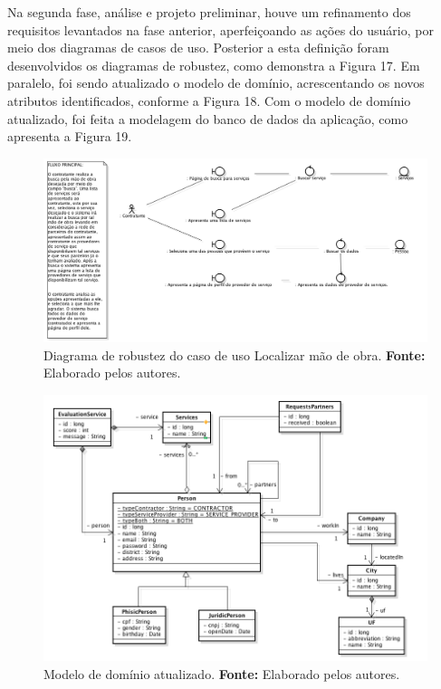 \par Na segunda fase, análise e projeto preliminar, houve um refinamento dos requisitos levantados na fase anterior, aperfeiçoando as ações do usuário, por meio dos diagramas de casos de uso. Posterior a esta definição foram desenvolvidos os diagramas de robustez, como demonstra a Figura 17. Em paralelo, foi sendo atualizado o modelo de domínio, acrescentando os novos atributos identificados, conforme a Figura 18. Com o modelo de domínio atualizado, foi feita a modelagem do banco de dados da aplicação, como apresenta a Figura 19.

\begin{figure}[h!]
	\centerline{\includegraphics[scale=0.35]{./imagens/robustez.png}}
	\caption[Diagrama de robustez do caso de uso Localizar mão de obra]
	{Diagrama de robustez do caso de uso Localizar mão de obra. \textbf{Fonte:} Elaborado pelos autores.}
	\label{fig:exemplo1}
\end{figure}

\begin{figure}[h!]
	\centerline{\includegraphics[scale=0.6]{./imagens/modelo-dominio-com-atributos.png}}
	\caption[Modelo de domínio atualizado]
	{Modelo de domínio atualizado. \textbf{Fonte:} Elaborado pelos autores.}
	\label{fig:exemplo1}
\end{figure} 

